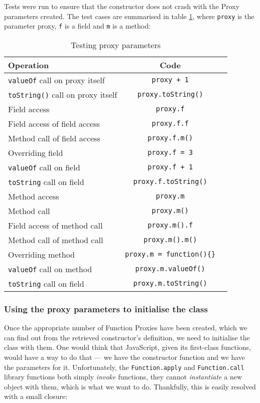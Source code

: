 Tests were run to ensure that the constructor does not crash with the Proxy parameters created. The test cases are summarised in table \ref{nocrash}, where \texttt{proxy} is the parameter proxy, \texttt{f} is a field and \texttt{m} is a method:

\begin{table}[h]
\centering
\begin{tabular}{lcc}
\toprule
\textbf{Operation} & \textbf{Code} \\
\toprule
\texttt{valueOf} call on proxy itself & \texttt{proxy + 1}\\
\texttt{toString()} call on proxy itself & \texttt{proxy.toString()}\\
Field access & \texttt{proxy.f} \\
Field access of field access & \texttt{proxy.f.f} \\
Method call of field access & \texttt{proxy.f.m()} \\
Overriding field & \texttt{proxy.f = 3} \\
\texttt{valueOf} call on field & \texttt{proxy.f + 1} \\
\texttt{toString} call on field & \texttt{proxy.f.toString()} \\
Method access & \texttt{proxy.m} \\
Method call & \texttt{proxy.m()} \\
Field access of method call & \texttt{proxy.m().f} \\
Method call of method call & \texttt{proxy.m().m()} \\
Overriding method & \texttt{proxy.m = function()\{\}} \\
\texttt{valueOf} call on method & \texttt{proxy.m.valueOf()} \\
\texttt{toString} call on field & \texttt{proxy.m.toString()} \\
\end{tabular}
\caption{Testing proxy parameters}
\label{nocrash}
\end{table}

\subsubsection{Using the proxy parameters to initialise the class}
Once the appropriate number of Function Proxies have been created, which we can find out from the retrieved constructor's definition, we need to initialise the class with them. One would think that JavaScript, given its first-class functions, would have a way to do that --- we have the constructor function and we have the parameters for it. Unfortunately, the \texttt{Function.apply} and \texttt{Function.call} library functions both simply \emph{invoke} functions, they cannot \emph{instantiate} a new object with them, which is what we want to do. Thankfully, this is easily resolved with a small closure:

